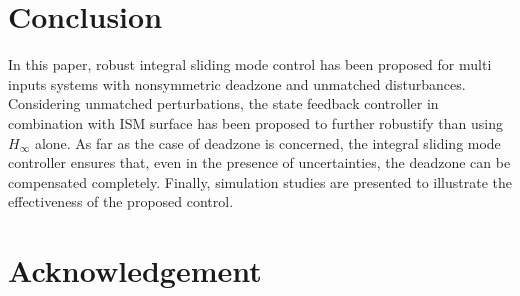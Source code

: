 \documentclass[journal,onecolumn]{IEEEtran}
\begin{document}
\section{Conclusion}

In this paper, robust integral sliding mode control has been
proposed for multi inputs systems with nonsymmetric deadzone and
unmatched disturbances. Considering unmatched perturbations, the
state feedback controller in combination with ISM surface has been
proposed to further robustify than using $H_\infty$ alone. As far as
the case of deadzone is concerned,  the integral sliding mode
controller ensures that, even in the presence of uncertainties, the
deadzone can be compensated completely. Finally, simulation studies
are presented to illustrate the effectiveness of the proposed
control.





















\section*{Acknowledgement}
\end{document}
